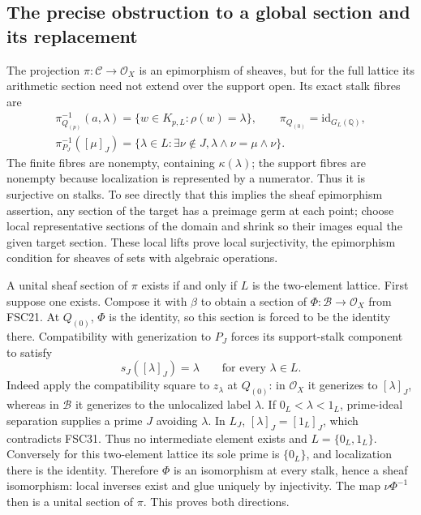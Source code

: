 \subsection{The precise obstruction to a global section and its replacement}
The projection $\pi:\mathcal C\to\mathcal O_X$ is an epimorphism of
sheaves, but for the full lattice its arithmetic section need not
extend over the support open. Its exact stalk fibres are
\begin{equation}\tag{FSC30}
 \begin{gathered}
 \pi^{-1}_{Q_{(p)}}(a,\lambda)
       =\{w\in K_{p,L}:\rho(w)=\lambda\},\qquad
 \pi_{Q_{(0)}}=\mathrm{id}_{G_L(\mathbb Q)},\\
 \pi^{-1}_{P_J}([\mu]_J)
       =\{\lambda\in L:\exists\nu\notin J,                          \lambda\wedge\nu=\mu\wedge\nu\}.
 \end{gathered}
\end{equation}
The finite fibres are nonempty, containing $\kappa(\lambda)$;
the support fibres are nonempty because localization is represented
by a numerator. Thus it is surjective on stalks. To see directly that
this implies the sheaf epimorphism assertion, any section of the target
has a preimage germ at each point; choose local representative sections
of the domain and shrink so their images equal the given target
section. These local lifts prove local surjectivity, the epimorphism
condition for sheaves of sets with algebraic operations.

A unital sheaf section of $\pi$ exists if and only if $L$ is the
two-element lattice. First suppose one exists. Compose it with $\beta$
to obtain a section of $\Phi:\mathcal B\to\mathcal O_X$ from FSC21.
At $Q_{(0)}$, $\Phi$ is the identity, so this section is forced to be
the identity there. Compatibility with generization to $P_J$ forces
its support-stalk component to satisfy
\begin{equation}\tag{FSC31}
 s_J([\lambda]_J)=\lambda\qquad\text{for every }\lambda\in L.
\end{equation}
Indeed apply the compatibility square to $z_\lambda$ at $Q_{(0)}$:
in $\mathcal O_X$ it generizes to $[\lambda]_J$, whereas in
$\mathcal B$ it generizes to the unlocalized label $\lambda$.
If $0_L<\lambda<1_L$, prime-ideal separation supplies a prime $J$
avoiding $\lambda$. In $L_J$, $[\lambda]_J=[1_L]_J$, which contradicts
FSC31. Thus no intermediate element exists and $L=\{0_L,1_L\}$.
Conversely for this two-element lattice its sole prime is $\{0_L\}$,
and localization there is the identity. Therefore $\Phi$ is an
isomorphism at every stalk, hence a sheaf isomorphism: local inverses
exist and glue uniquely by injectivity. The map $\nu\Phi^{-1}$ then
is a unital section of $\pi$. This proves both directions.

